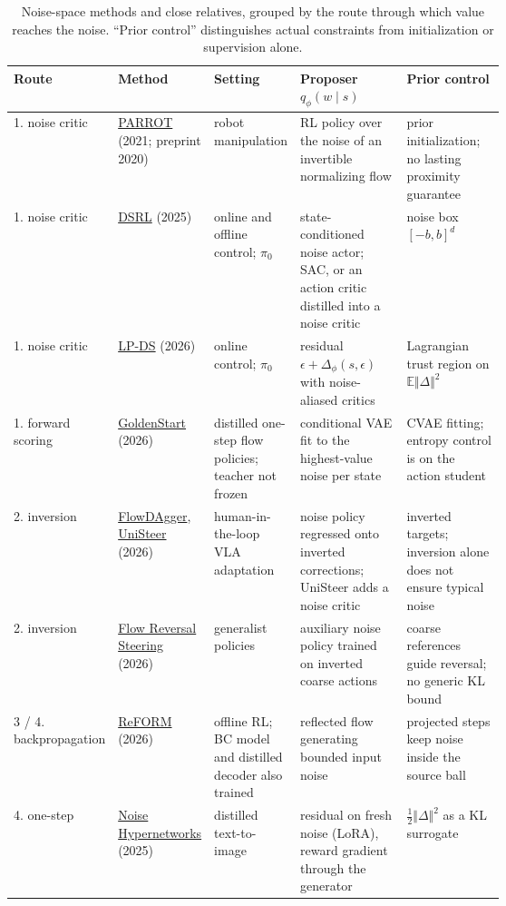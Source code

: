 \begin{table}[htbp]
\centering\footnotesize
\caption{Noise-space methods and close relatives, grouped by the route through which value reaches the noise. ``Prior control'' distinguishes actual constraints from initialization or supervision alone.}
\label{tab:map}
\begin{tabularx}{\linewidth}{@{}>{\raggedright}p{0.12\linewidth}>{\raggedright}p{0.14\linewidth}>{\raggedright}p{0.17\linewidth}>{\raggedright}X>{\raggedright\arraybackslash}p{0.2\linewidth}@{}}
\toprule
Route & Method & Setting & Proposer $q_\phi(w \mid s)$ & Prior control \\
\midrule
1. noise critic & \hyperlink{ref:17}{PARROT} (2021; preprint 2020) & robot manipulation & RL policy over the noise of an invertible normalizing flow & prior initialization; no lasting proximity guarantee \\
1. noise critic & \hyperlink{ref:19}{DSRL} (2025) & online and offline control; $\pi_0$ & state-conditioned noise actor; SAC, or an action critic distilled into a noise critic & noise box $[-b, b]^d$ \\
1. noise critic & \hyperlink{ref:16}{LP-DS} (2026) & online control; $\pi_0$ & residual $\epsilon + \Delta_\phi(s, \epsilon)$ with noise-aliased critics & Lagrangian trust region on $\mathbb{E}\Vert\Delta\Vert^2$ \\
1. forward scoring & \hyperlink{ref:21}{GoldenStart} (2026) & distilled one-step flow policies; teacher not frozen & conditional VAE fit to the highest-value noise per state & CVAE fitting; entropy control is on the action student \\
2. inversion & \hyperlink{ref:13}{FlowDAgger}, \hyperlink{ref:9}{UniSteer} (2026) & human-in-the-loop VLA adaptation & noise policy regressed onto inverted corrections; UniSteer adds a noise critic & inverted targets; inversion alone does not ensure typical noise \\
2. inversion & \hyperlink{ref:18}{Flow Reversal Steering} (2026) & generalist policies & auxiliary noise policy trained on inverted coarse actions & coarse references guide reversal; no generic KL bound \\
3 / 4. backpropagation & \hyperlink{ref:23}{ReFORM} (2026) & offline RL; BC model and distilled decoder also trained & reflected flow generating bounded input noise & projected steps keep noise inside the source ball \\
4. one-step & \hyperlink{ref:4}{Noise Hypernetworks} (2025) & distilled text-to-image & residual on fresh noise (LoRA), reward gradient through the generator & $\tfrac12\Vert\Delta\Vert^2$ as a KL surrogate \\

\end{tabularx}
\end{table}
